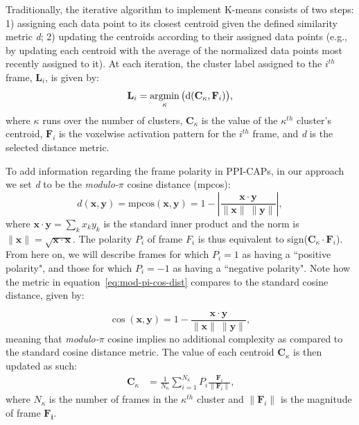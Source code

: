 Traditionally, the iterative algorithm to implement K-means consists of two steps: 1) assigning each data point to its closest centroid given the defined similarity metric \textit{d}; 2) updating the centroids according to their assigned data points (e.g., by updating each centroid with the average of the normalized data points most recently assigned to it). At each iteration, the cluster label assigned to the $i^{th}$ frame, $\mathbf{L}_i$, is given by:
 \begin{equation} \label{eq:labelassigment}
 \mathbf{L}_i = \operatorname*{argmin}_{\kappa} \big( \text{d}( \mathbf{C}_\kappa, \mathbf{F}_i )  \big)\text{,}
 \end{equation}
 where $\kappa$ runs over the number of clusters, $\mathbf{C}_\kappa$ is the value of the $\kappa^{th}$ cluster's centroid, $\mathbf{F}_i$ is the voxelwise activation pattern for the $i^{th}$ frame, and \textit{d} is the selected distance metric.
 
 
 
 To add information regarding the frame polarity in PPI-CAPs, in our approach we set \textit{d} to be the \textit{modulo-$\pi$} cosine distance (mpcos):
 \begin{equation}
 \label{eq:mod-pi-cos-dist}
 d(\mathbf{x},\mathbf{y}) =\mathrm{mpcos}(\mathbf{x},\mathbf{y}) = 1 -  \left|  \frac{ \mathbf{x} \cdot  \mathbf{y}}{\|\mathbf{x}\| ~\|\mathbf{y}\|} \right|,
 \end{equation}
 where $  \mathbf{x} \cdot \mathbf{y} = \sum_k x_k y_k  $ is  the standard inner product and the norm is $\| \mathbf{x} \|= \sqrt{\mathbf{x} \cdot \mathbf{x}}$. The polarity $P_i$ of  frame $F_i$ is thus equivalent to sign($  \mathbf{C}_\kappa \cdot \mathbf{F}_i $). From here on, we will describe frames for which $P_i = 1$ as having a ``positive polarity", and those for which $P_i = -1$ as having a ``negative polarity". Note how the metric in equation~\eqref{eq:mod-pi-cos-dist} compares to the standard cosine distance, given by:
 
 \begin{equation}
 \cos(\mathbf{x},\mathbf{y}) = 1 -  \frac{ \mathbf{x} \cdot  \mathbf{y}}{\|\mathbf{x}\| ~\|\mathbf{y}\|} ,
 \end{equation}
meaning that \textit{modulo-$\pi$} cosine implies no additional complexity as compared to the standard cosine distance metric.
 The value of each centroid $\mathbf{C}_\kappa$ is then updated as such:
\begin{align}\label{eq:centroid}
\mathbf{C}_\kappa &= \frac{1}{N_\kappa} \sum_{i=1}^{N_\kappa} P_i \frac{\mathbf{F}_i}{\|\mathbf{F}_i\|}\text{,} 
\end{align}
where $N_\kappa$ is the number of frames in the $\kappa^{th}$ cluster and $\|\mathbf{F}_i\|$ is the magnitude of frame $\mathbf{F_i}$.

